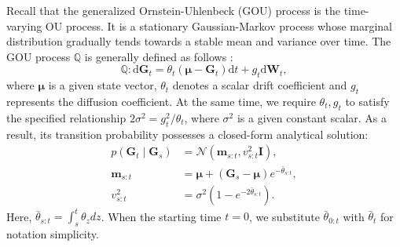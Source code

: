 Recall that the generalized Ornstein-Uhlenbeck (GOU) process is the time-varying OU process.
It is a stationary Gaussian-Markov process whose marginal distribution gradually tends towards a stable mean and variance over time. 
The GOU process $\mathbb{Q}$ is generally defined as follows \cite{GOU1988,IRSDE+ICML2023}:
\begin{equation}
\mathbb{Q}: \mathrm{d}\bm{G}_t=\theta_t\left(\bm{\mu}-\bm{G}_t\right)\mathrm{d}t+g_t\mathrm{d}\bm{W}_t,
\end{equation}
where $\bm{\mu}$ is a given state vector, $\theta_t$ denotes a scalar drift coefficient and $g_t$ represents the diffusion coefficient. At the same time, we require $\theta_t,g_t$ to satisfy the specified relationship $2\sigma^2=g_t^2/\theta_t$, where $\sigma^2$ is a given constant scalar. As a result, its transition probability possesses a closed-form analytical solution:
\begin{equation}
\begin{split}
p\left(\bm{G}_{t}\mid \bm{G}_s\right)
& =\mathcal{N}(\mathbf{m}_{s:t},v_{s:t}^{2}\bm{I}), \\
\mathbf{m}_{s:t} 
& = \bm{\mu}+\left(\bm{G}_s-\bm{\mu}\right)e^{-\bar{\theta}_{s:t}},\\
v_{s:t}^{2} 
&= \sigma^2 \left(1-e^{-2\bar{\theta}_{s:t}}\right).
\end{split}
\end{equation}
Here, $\bar{\theta}_{s:t}=\int_s^t\theta_zdz$. When the starting time $t=0$, we substitute $\bar{\theta}_{0:t}$ with $\bar{\theta}_t$ for notation simplicity. 





